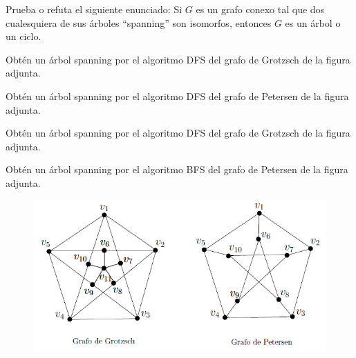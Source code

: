 \documentclass[twoside]{article}
\begin{document}
\newpage

\begin{ejercicio}{1.7}
Prueba o refuta el siguiente enunciado: Si $G$ es un grafo conexo tal que dos cualesquiera
de sus árboles ``spanning'' son isomorfos, entonces $G$ es un árbol o un ciclo.
\end{ejercicio}
\begin{solucion}

\end{solucion}

\newpage

\begin{ejercicio}{1.8}
Obtén un árbol spanning por el algoritmo DFS del grafo de Grotzsch de la figura adjunta.
\end{ejercicio}
\begin{solucion}





\end{solucion}
\newpage

\begin{ejercicio}{1.9}
Obtén un árbol spanning por el algoritmo DFS del grafo de Petersen de la figura adjunta.
\end{ejercicio}
\begin{solucion}

\end{solucion}
\newpage

\begin{ejercicio}{1.10}
Obtén un árbol spanning por el algoritmo DFS del grafo de Grotzsch de la figura adjunta.
\end{ejercicio}
\begin{solucion}

\end{solucion}

\newpage

\begin{ejercicio}{1.11}
Obtén un árbol spanning por el algoritmo BFS del grafo de Petersen de la figura adjunta.
\end{ejercicio}
\begin{solucion}



\end{solucion}

\newpage

\begin{figure}[h!]
\includegraphics[scale=0.8]{Rel1}
\end{figure}
%
%
%
%
\end{document}
